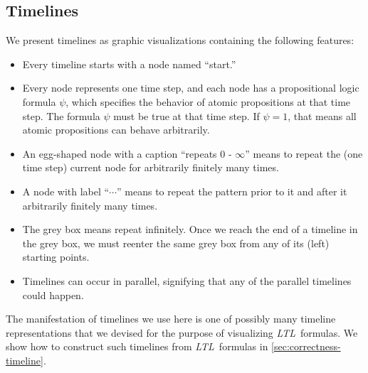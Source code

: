 \documentclass[conference]{IEEEtran}
\theoremstyle{definition}
\theoremstyle{remark}
\newcommand{\ltl}{\textit{LTL}}
\begin{document}
\subsection{Timelines}\label{sec:timeline}
We present timelines as graphic visualizations containing the following features:
\begin{itemize}
    \item Every timeline starts with a node named ``start.''
    \item Every node represents one time step, and each node has a propositional logic formula $\psi$, which specifies the behavior of atomic propositions at that time step. The formula $\psi$ must be true at that time step. If $\psi = 1$, that means all atomic propositions can behave arbitrarily.
    \item An egg-shaped node with a caption ``repeats $0$ - $\infty$'' means to repeat the (one time step) current node for arbitrarily finitely many times.
    \item A node with label ``$\cdots$'' means to repeat the pattern prior to it and after it arbitrarily finitely many times.
    \item The grey box means repeat infinitely. Once we reach the end of a timeline in the grey box, we must reenter the same grey box from any of its (left) starting points.
    \item Timelines can occur in parallel, signifying that any of the parallel timelines could happen.
\end{itemize}

The manifestation of timelines we use here is one of possibly many timeline representations that we devised for the purpose of visualizing \ltl\ formulas. We show how to construct such timelines from \ltl\ formulas in \cref{sec:correctness-timeline}.
\end{document}
